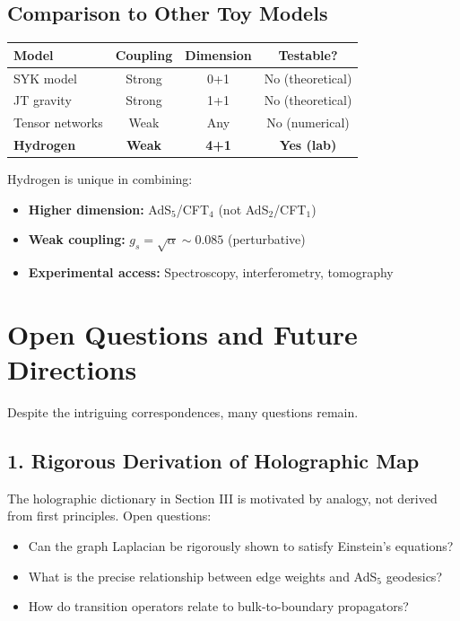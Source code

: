 \documentclass[aps,prd,twocolumn,superscriptaddress,floatfix]{revtex4-2}
\begin{document}
\subsection{Comparison to Other Toy Models}

\begin{center}
\begin{tabular}{|l|c|c|c|}
\hline
\textbf{Model} & \textbf{Coupling} & \textbf{Dimension} & \textbf{Testable?} \\
\hline
SYK model & Strong & 0+1 & No (theoretical) \\
JT gravity & Strong & 1+1 & No (theoretical) \\
Tensor networks & Weak & Any & No (numerical) \\
\textbf{Hydrogen} & \textbf{Weak} & \textbf{4+1} & \textbf{Yes (lab)} \\
\hline
\end{tabular}
\end{center}

Hydrogen is unique in combining:
\begin{itemize}
\item \textbf{Higher dimension:} AdS$_5$/CFT$_4$ (not AdS$_2$/CFT$_1$)
\item \textbf{Weak coupling:} $g_s = \sqrt{\alpha} \sim 0.085$ (perturbative)
\item \textbf{Experimental access:} Spectroscopy, interferometry, tomography
\end{itemize}


\section{Open Questions and Future Directions}

Despite the intriguing correspondences, many questions remain.

\subsection{1. Rigorous Derivation of Holographic Map}

The holographic dictionary in Section III is motivated by analogy, not derived from first principles. Open questions:
\begin{itemize}
\item Can the graph Laplacian be rigorously shown to satisfy Einstein's equations?
\item What is the precise relationship between edge weights and AdS$_5$ geodesics?
\item How do transition operators relate to bulk-to-boundary propagators?
\end{itemize}
\end{document}
